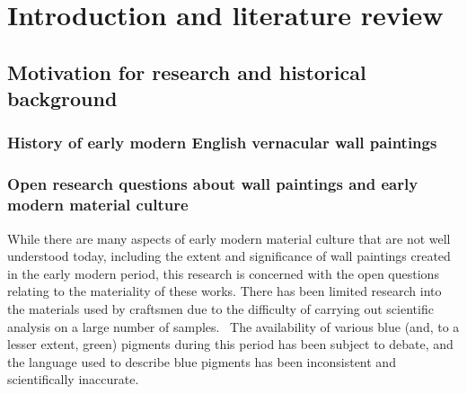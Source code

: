 

\chapter{Introduction and literature review}


\ifpdf
    \graphicspath{{Chapter1/Figs/Raster/}{Chapter1/Figs/PDF/}{Chapter1/Figs/}}
\else
    \graphicspath{{Chapter1/Figs/Vector/}{Chapter1/Figs/}}
\fi



\section[Motivation for research and historical background]{Motivation for research and historical background}
\label{section1.1}


\subsection[History of early modern English wall paintings]{History of early modern English vernacular wall paintings}
\label{subsection1.1.1}


\subsection[Open research questions about wall paintings]{Open research questions about wall paintings and early modern material culture}
\label{subsection1.1.2}

While there are many aspects of early modern material culture that are not well understood today, including the extent and significance of wall paintings created in the early modern period, this research is concerned with the open questions relating to the materiality of these works. There has been limited research into the materials used by craftsmen due to the difficulty of carrying out scientific analysis on a large number of samples.~\cite{baird,davies} The availability of various blue (and, to a lesser extent, green) pigments during this period has been subject to debate, and the language used to describe blue pigments has been inconsistent and scientifically inaccurate.~\cite{harley} 

